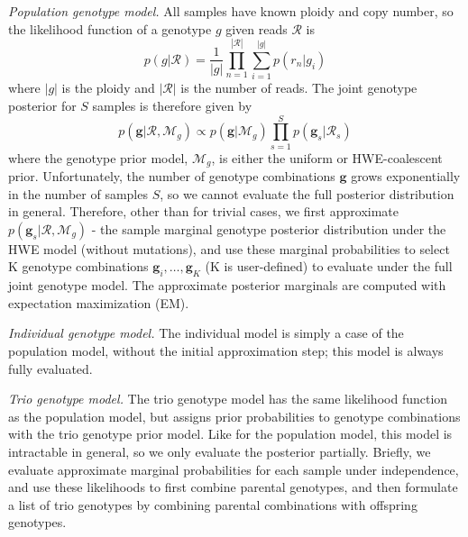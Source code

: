 \documentclass[notitlepage, twocolumn, 10pt]{article}
\begin{document}
\vspace{3mm}
\noindent\emph{Population genotype model.} All samples have known ploidy and copy number, so the likelihood function of a genotype $g$ given reads $\mathcal{R}$ is
\begin{equation*}
	p(g | \mathcal{R}) = \frac{1}{|g|} \prod_{n=1}^{|\mathcal{R}|} \sum_{i = 1}^{|g|} p(r_n | g_{i})
\end{equation*}
where $|g|$ is the ploidy and $|\mathcal{R}|$ is the number of reads. The joint genotype posterior for $S$ samples is therefore given by
\begin{equation*}
	p(\boldsymbol{g} | \boldsymbol{\mathcal{R}}, \mathcal{M}_g) \propto p(\boldsymbol{g} | \mathcal{M}_g) \prod_{s=1}^S p(\boldsymbol{g}_s | \boldsymbol{\mathcal{R}}_s)
\end{equation*}
where the genotype prior model, $\mathcal{M}_g$, is either the uniform or HWE-coalescent prior. Unfortunately, the number of genotype combinations $\boldsymbol{g}$ grows exponentially in the number of samples $S$, so we cannot evaluate the full posterior distribution in general. Therefore, other than for trivial cases, we first approximate $p(\boldsymbol{g}_s | \boldsymbol{\mathcal{R}}, \mathcal{M}_g)$ - the sample marginal genotype posterior distribution under the HWE model (without mutations), and use these marginal probabilities to select K genotype combinations $\boldsymbol{g}_i, \dots, \boldsymbol{g}_K$ (K is user-defined) to evaluate under the full joint genotype model. The approximate posterior marginals are computed with expectation maximization (EM).

\vspace{3mm}
\noindent\emph{Individual genotype model.} The individual model is simply a case of the population model, without the initial approximation step; this model is always fully evaluated.

\vspace{3mm}
\noindent\emph{Trio genotype model.} The trio genotype model has the same likelihood function as the population model, but assigns prior probabilities to genotype combinations with the trio genotype prior model. Like for the population model, this model is intractable in general, so we only evaluate the posterior partially. Briefly, we evaluate approximate marginal probabilities for each sample under independence, and use these likelihoods to first combine parental genotypes, and then formulate a list of trio genotypes by combining parental combinations with offspring genotypes.
\end{document}
